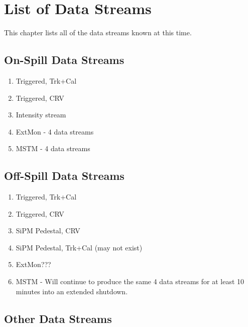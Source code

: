 %
%
%

\chapter{List of Data Streams}
\label{ch:data_streams}

This chapter lists all of the data streams known at this time.

\section{On-Spill Data Streams}
\label{sec:on_spill_data_streams}

\begin{enumerate}
\item Triggered, Trk+Cal
\item Triggered, CRV
\item Intensity stream
\item ExtMon - 4 data streams
\item MSTM - 4 data streams
\end{enumerate}

\section{Off-Spill Data Streams}
\label{sec:off_spill_data_streams}

\begin{enumerate}
\item Triggered, Trk+Cal
\item Triggered, CRV
\item SiPM Pedestal, CRV
  \item SiPM Pedestal, Trk+Cal (may not exist)
\item ExtMon???
\item MSTM - Will continue to produce the same 4 data streams for at least 10 minutes into an extended shutdown.
\end{enumerate}

\section{Other Data Streams}
\label{sec:Other_data_streams}

